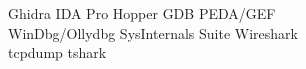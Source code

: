 Ghidra \textbullet{} IDA Pro \textbullet{} Hopper \textbullet{}  GDB \textbullet{} PEDA/GEF \\
WinDbg/Ollydbg \textbullet{} SysInternals Suite \textbullet{} Wireshark \\
tcpdump \textbullet{} tshark